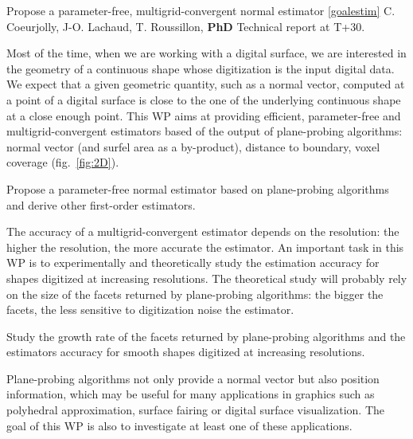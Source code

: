 

\medskip
{}
   {Propose a parameter-free, multigrid-convergent normal estimator \ref{goalestim}}
   {C. Coeurjolly, J-O. Lachaud, T. Roussillon, \textbf{PhD}}
   {Technical report at T+30.}
\medskip

 Most of the time, when we are working with a digital surface, we are 
interested in the geometry of a continuous shape whose digitization is the input digital data.
We expect that a given geometric quantity, such as a normal vector, computed at a point of a digital surface
is close to the one of the underlying continuous shape at a close enough point. 
This WP aims at providing efficient, parameter-free and multigrid-convergent estimators based of
the output of plane-probing algorithms: normal vector (and surfel area as a by-product),
distance to boundary, voxel coverage (fig.~\ref{fig:2D}).

\begin{Task}
  \label{task:normal}
  Propose a parameter-free normal estimator based on plane-probing algorithms and
  derive other first-order estimators.  
\end{Task}

The accuracy of a multigrid-convergent estimator depends on the resolution: the higher the resolution,
the more accurate the estimator. An important task in this WP is to experimentally and theoretically
study the estimation accuracy for shapes digitized at increasing resolutions. The theoretical study
will probably rely on the size of the facets returned by plane-probing algorithms: the bigger the facets,
the less sensitive to digitization noise the estimator. 

\begin{Task}
  \label{task:conv}
  Study the growth rate of the facets returned by plane-probing algorithms
  and the estimators accuracy for smooth shapes digitized at increasing resolutions. 
\end{Task}

Plane-probing algorithms not only provide a normal vector but also position information,
which may be useful for many applications in graphics such as polyhedral approximation,
surface fairing or digital surface visualization. The goal of this WP is also to investigate
at least one of these applications.   

